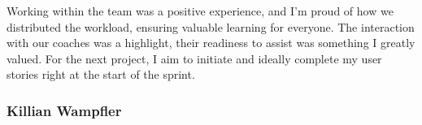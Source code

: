 Working within the team was a positive experience, and I'm proud of how we distributed the workload, ensuring valuable learning for everyone.
The interaction with our coaches was a highlight, their readiness to assist was something I greatly valued.
For the next project, I aim to initiate and ideally complete my user stories right at the start of the sprint.

\subsubsection{Killian Wampfler}
